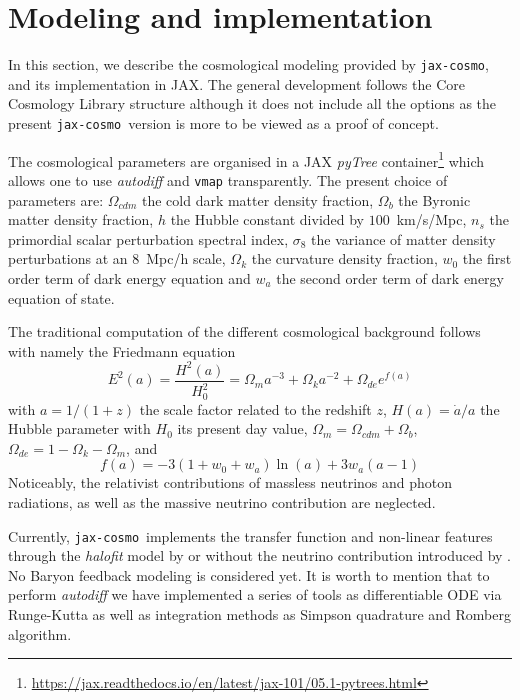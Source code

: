 \documentclass[twocolumn,twocolappendix,nofootinbib]{openjournal}
\newcommand{\jaxcosmo}{\texttt{jax-cosmo}}
\begin{document}

\section{Modeling and implementation}
\label{sec-jaxcosmo-design}
In this section, we describe the cosmological modeling provided by \jaxcosmo, and its implementation in JAX. The general development follows the Core Cosmology Library structure \citep{2019ApJS..242....2C} although it does not include all the options as the present \jaxcosmo\ version is more to be viewed as a proof of concept.

The cosmological parameters are organised in a JAX \textit{pyTree} container\footnote{\url{https://jax.readthedocs.io/en/latest/jax-101/05.1-pytrees.html}} which allows one to use \textit{autodiff} and \texttt{vmap} transparently. The present choice of parameters are: $\Omega_{cdm}$ the cold dark matter density fraction, $\Omega_b$ the Byronic matter density fraction, $h$ the Hubble constant divided by $100$~km/s/Mpc, $n_s$ the primordial scalar perturbation spectral index, $\sigma_8$ the variance of matter density perturbations at an $8$~Mpc/h scale, $\Omega_k$ the curvature density fraction, $w_0$ the first order term of dark energy equation and $w_a$ the second order term of dark energy equation of state. 

The traditional computation of the different cosmological background follows \cite{2005A&A...443..819P}  with namely the Friedmann equation
\begin{equation}
    E^2(a) = \frac{H^2(a)}{H^2_0} = \Omega_m a^{-3} + \Omega_k a^{-2} + \Omega_{de} e^{f(a)}
\end{equation}
with $a=1/(1+z)$ the scale factor related to the redshift $z$, $H(a)=\dot{a}/a$ the Hubble parameter with $H_0$ its present day value, $\Omega_m= \Omega_{cdm}+\Omega_b$, $\Omega_{de}=1-\Omega_k-\Omega_m$, and 
\begin{equation}
    f(a) = -3 (1 + w_0 + w_a) \ln(a) + 3 w_a (a - 1)
\end{equation}
Noticeably, the relativist contributions of massless neutrinos and photon radiations, as well as the massive neutrino contribution are neglected.

Currently, \jaxcosmo\  implements the \cite{Eisenstein_1998} transfer function and non-linear features through the \textit{halofit} model by \cite{2012ApJ...761..152T} or \cite{2003MNRAS.341.1311S} without the neutrino contribution introduced by \cite{10.1111/j.1365-2966.2011.20222.x}. No Baryon feedback modeling is considered yet. It is worth to mention that to perform \textit{autodiff} we have implemented a series of tools as differentiable ODE via Runge-Kutta as well as integration methods as Simpson quadrature and Romberg algorithm.
\end{document}
